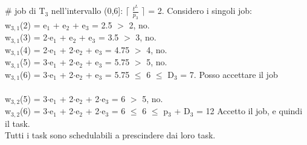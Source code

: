 \documentclass[12pt, oneside]{extbook}
\begin{document}
\# job di T$_{3}$ nell'intervallo (0,6]: $\lceil$ $\frac{t^L}{p_{3}}$ $\rceil$ = 2. Considero i  singoli job:\\
w$_{3,1}$(2) = e$_{1}$ + e$_{2}$ + e$_{3}$ = 2.5 $>$ 2, no.\\
w$_{3,1}$(3) = 2$\cdot$e$_{1}$ + e$_{2}$ + e$_{3}$ = 3.5 $>$ 3, no.\\
w$_{3,1}$(4) = 2$\cdot$e$_{1}$ + 2$\cdot$e$_{2}$ + e$_{3}$ = 4.75 $>$ 4, no.\\
w$_{3,1}$(5) = 3$\cdot$e$_{1}$ + 2$\cdot$e$_{2}$ + e$_{3}$ = 5.75 $>$ 5, no.\\
w$_{3,1}$(6) = 3$\cdot$e$_{1}$ + 2$\cdot$e$_{2}$ + e$_{3}$ = 5.75 $\leq$ 6 $\leq$ D$_{3}$ = 7. Posso accettare il job\\\\
w$_{3,2}$(5) = 3$\cdot$e$_{1}$ + 2$\cdot$e$_{2}$ + 2$\cdot$e$_{3}$ = 6 $>$ 5, no.\\
w$_{3,2}$(6) = 3$\cdot$e$_{1}$ + 2$\cdot$e$_{2}$ + 2$\cdot$e$_{3}$ = 6 $\leq$ 6 $\leq$ p$_{3}$ + D$_{3}$ = 12 Accetto il job, e quindi il task.\\ Tutti i task sono schedulabili a prescindere dai loro task.\\ 
\end{document}
